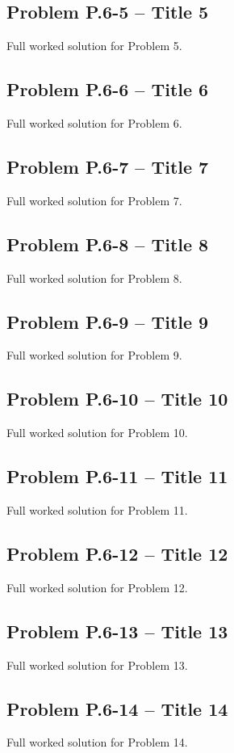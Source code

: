 \documentclass[12pt]{article}
\begin{document}
\subsection*{Problem P.6-5 – Title 5}
Full worked solution for Problem 5.


\subsection*{Problem P.6-6 – Title 6}
Full worked solution for Problem 6.


\subsection*{Problem P.6-7 – Title 7}
Full worked solution for Problem 7.


\subsection*{Problem P.6-8 – Title 8}
Full worked solution for Problem 8.


\subsection*{Problem P.6-9 – Title 9}
Full worked solution for Problem 9.


\subsection*{Problem P.6-10 – Title 10}
Full worked solution for Problem 10.


\subsection*{Problem P.6-11 – Title 11}
Full worked solution for Problem 11.


\subsection*{Problem P.6-12 – Title 12}
Full worked solution for Problem 12.


\subsection*{Problem P.6-13 – Title 13}
Full worked solution for Problem 13.


\subsection*{Problem P.6-14 – Title 14}
Full worked solution for Problem 14.
\end{document}
